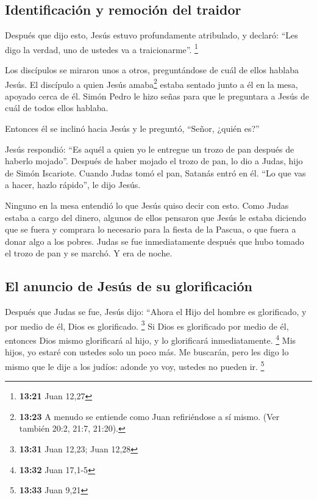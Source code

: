 \hypertarget{identificaciuxf3n-y-remociuxf3n-del-traidor}{%
\subsection{Identificación y remoción del
traidor}\label{identificaciuxf3n-y-remociuxf3n-del-traidor}}

 Después que dijo esto, Jesús estuvo profundamente
atribulado, y declaró: ``Les digo la verdad, uno de ustedes va a
traicionarme''. \footnote{\textbf{13:21} Juan 12,27}

 Los discípulos se miraron unos a otros, preguntándose de
cuál de ellos hablaba Jesús.  El discípulo a quien Jesús
amaba\footnote{\textbf{13:23} A menudo se entiende como Juan
  refiriéndose a sí mismo. (Ver también 20:2, 21:7, 21:20).} estaba
sentado junto a él en la mesa, apoyado cerca de él. 
Simón Pedro le hizo señas para que le preguntara a Jesús de cuál de
todos ellos hablaba.

 Entonces él se inclinó hacia Jesús y le preguntó,
``Señor, ¿quién es?''

 Jesús respondió: ``Es aquél a quien yo le entregue un
trozo de pan después de haberlo mojado''.  Después de
haber mojado el trozo de pan, lo dio a Judas, hijo de Simón Iscariote.
Cuando Judas tomó el pan, Satanás entró en él. ``Lo que vas a hacer,
hazlo rápido'', le dijo Jesús.

 Ninguno en la mesa entendió lo que Jesús quiso decir con
esto.  Como Judas estaba a cargo del dinero, algunos de
ellos pensaron que Jesús le estaba diciendo que se fuera y comprara lo
necesario para la fiesta de la Pascua, o que fuera a donar algo a los
pobres.  Judas se fue inmediatamente después que hubo
tomado el trozo de pan y se marchó. Y era de noche.

\hypertarget{el-anuncio-de-jesuxfas-de-su-glorificaciuxf3n}{%
\subsection{El anuncio de Jesús de su
glorificación}\label{el-anuncio-de-jesuxfas-de-su-glorificaciuxf3n}}

 Después que Judas se fue, Jesús dijo: ``Ahora el Hijo
del hombre es glorificado, y por medio de él, Dios es glorificado.
\footnote{\textbf{13:31} Juan 12,23; Juan 12,28}  Si Dios
es glorificado por medio de él, entonces Dios mismo glorificará al hijo,
y lo glorificará inmediatamente. \footnote{\textbf{13:32} Juan 17,1-5}
 Mis hijos, yo estaré con ustedes solo un poco más. Me
buscarán, pero les digo lo mismo que le dije a los judíos: adonde yo
voy, ustedes no pueden ir. \footnote{\textbf{13:33} Juan 9,21}

